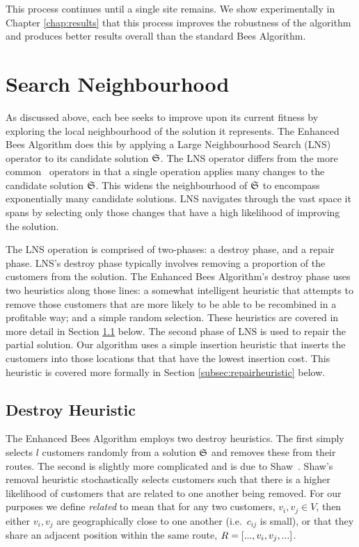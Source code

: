 This process continues until a single site remains. We show experimentally in Chapter \ref{chap:results} that this process improves the robustness of the algorithm and produces better results overall than the standard Bees Algorithm. 

\section{Search Neighbourhood}
\label{sec:searchneighbourhood}

As discussed above, each bee seeks to improve upon its current fitness by exploring the local neighbourhood of the solution it represents. The Enhanced Bees Algorithm does this by applying a Large Neighbourhood Search (LNS) operator to its candidate solution $\mathfrak{S}$. The LNS operator differs from the more common \VRP\ operators in that a single operation applies many changes to the candidate solution $\mathfrak{S}$. This widens the neighbourhood of $\mathfrak{S}$ to encompass exponentially many candidate solutions. LNS navigates through the vast space it spans by selecting only those changes that have a high likelihood of improving the solution.

The LNS operation is comprised of two-phases: a destroy phase, and a repair phase. LNS's destroy phase typically involves removing a proportion of the customers from the solution. The Enhanced Bees Algorithm's destroy phase uses two heuristics along those lines: a somewhat intelligent heuristic that attempts to remove those customers that are more likely to be able to be recombined in a profitable way; and a simple random selection. These heuristics are covered in more detail in Section \ref{subsec:destroyheuristic} below. The second phase of LNS is used to repair the partial solution. Our algorithm uses a simple insertion heuristic that inserts the customers into those locations that that have the lowest insertion cost. This heuristic is covered more formally in Section \ref{subsec:repairheuristic} below.

\subsection{Destroy Heuristic}
\label{subsec:destroyheuristic}

The Enhanced Bees Algorithm employs two destroy heuristics. The first simply selects $l$ customers randomly from a solution $\mathfrak{S}$ and removes these from their routes. The second is slightly more complicated and is due to Shaw~\cite{Shaw:1998}. Shaw's removal heuristic stochastically selects customers such that there is a higher likelihood of customers that are related to one another being removed. For our purposes we define \emph{related} to mean that for any two customers, $v_i, v_j \in V$, then either $v_i, v_j$ are geographically close to one another (i.e.~$c_{ij}$ is small), or that they share an adjacent position within the same route, $R = [..., v_i, v_j, ...]$.

